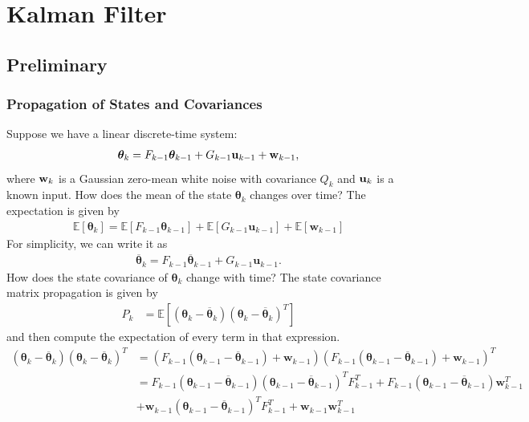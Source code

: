 \chapter{Kalman Filter}
\label{sec:advanced_kalman}


\section{Preliminary}
\subsection{Propagation of States and Covariances}

Suppose we have a linear discrete-time system:
\begin{align*}
	\boldsymbol{\theta}_{k}=F_{k-1}\boldsymbol{\theta}_{k-1}+G_{k-1}\mathbf{u}_{k-1}+{\mathbf{w}}_{k-1},
\end{align*}
where ${\mathbf{w}}_k$ is a Gaussian zero-mean white noise with covariance $Q_k$ and ${\mathbf{u}}_k$ is a known input. How does the mean of the state $\boldsymbol{\theta}_k$ changes over time? The expectation is given by
\begin{align*}
	\mathbb{E}[\boldsymbol{\theta}_{k}]=\mathbb{E}[F_{k-1}\boldsymbol{\theta}_{k-1}]+\mathbb{E}[G_{k-1}\mathbf{u}_{k-1}]+\mathbb{E}[\mathbf{w}_{k-1}]
\end{align*}
For simplicity, we can write it as
\begin{align*}
	\overline{\boldsymbol{\theta}}_{k}=F_{k-1}\overline{\boldsymbol{\theta}}_{k-1}+G_{k-1}\mathbf{u}_{k-1}.
\end{align*}
How does the state covariance of $\boldsymbol{\theta}_k$ change with time? The state covariance matrix propagation is given by
\begin{align*}
	P_{k}&=\mathbb{E}[(\boldsymbol{\theta}_{k}-\overline{\boldsymbol{\theta}}_{k})(\boldsymbol{\theta}_{k}-\overline{\boldsymbol{\theta}}_{k})^{T}]
\end{align*}
and then compute the expectation of every term in that expression. 
\begin{align*}
	(\boldsymbol{\theta}_{k}-\overline{\boldsymbol{\theta}}_{k})(\boldsymbol{\theta}_{k}-\overline{\boldsymbol{\theta}}_{k})^{T} & = (F_{k-1}(\boldsymbol{\theta}_{k-1}-\overline{\boldsymbol{\theta}}_{k-1})+\mathbf{w}_{k-1})(F_{k-1}(\boldsymbol{\theta}_{k-1}-\overline{\boldsymbol{\theta}}_{k-1})+\mathbf{w}_{k-1})^{T}\\ 
																							 & = F_{k-1}(\boldsymbol{\theta}_{k-1}-\overline{\boldsymbol{\theta}}_{k-1})(\boldsymbol{\theta}_{k-1}-\overline{\boldsymbol{\theta}}_{k-1})^{T}F_{k-1}^{T}+F_{k-1}(\boldsymbol{\theta}_{k-1}-\overline{\boldsymbol{\theta}}_{k-1})\mathbf{w}_{k-1}^{T} \\ 
																							 & +\mathbf{w}_{k-1}(\boldsymbol{\theta}_{k-1}-\overline{\boldsymbol{\theta}}_{k-1})^{T}F_{k-1}^{T}+\mathbf{w}_{k-1}\mathbf{w}_{k-1}^{T}
\end{align*}
